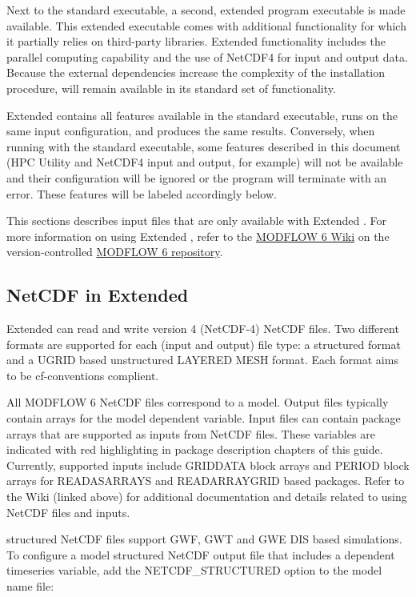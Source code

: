 Next to the standard \mf executable, a second, extended program executable is made available. This extended executable comes with additional functionality for which it partially relies on third-party libraries. Extended functionality includes the parallel computing capability and the use of NetCDF4 for input and output data. Because the external dependencies increase the complexity of the installation procedure, \mf will remain available in its standard set of functionality.

Extended \mf contains all features available in the standard executable, runs on the same input configuration, and produces the same results. Conversely, when running with the standard executable, some features described in this document (HPC Utility and NetCDF4 input and output, for example) will not be available and their configuration will be ignored or the program will terminate with an error. These features will be labeled accordingly below.

This sections describes input files that are only available with Extended \mf.  For more information on using Extended \mf, refer to the \href{https://github.com/MODFLOW-ORG/modflow6/wiki}{MODFLOW 6 Wiki} on the version-controlled \href{https://github.com/MODFLOW-ORG/modflow6}{MODFLOW 6 repository}.

\newpage
\subsection{NetCDF in Extended \mf}
Extended \mf can read and write version 4 (NetCDF-4) NetCDF files. Two different formats are supported for each (input and output) file type: a structured format and a UGRID based unstructured LAYERED MESH format. Each format aims to be cf-conventions complient.

All MODFLOW 6 NetCDF files correspond to a model. Output files typically contain arrays for the model dependent variable. Input files can contain package arrays that are supported as inputs from NetCDF files. These variables are indicated with red highlighting in package description chapters of this guide. Currently, supported inputs include GRIDDATA block arrays and PERIOD block arrays for READASARRAYS and READARRAYGRID based packages. Refer to the \mf Wiki (linked above) for additional documentation and details related to using NetCDF files and \mf inputs.

\mf structured NetCDF files support GWF, GWT and GWE DIS based simulations. To configure a model structured NetCDF output file that includes a dependent timeseries variable, add the NETCDF\_STRUCTURED option to the model name file:


